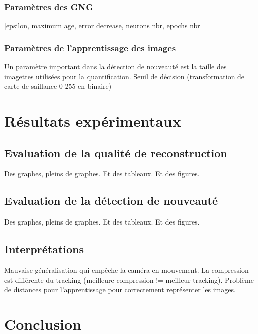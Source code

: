 	\subsubsection{Paramètres des GNG}

	[epsilon, maximum age, error decrease, neurons nbr, epochs nbr]

	\subsubsection{Paramètres de l'apprentissage des images}

	Un paramètre important dans la détection de nouveauté est la taille des imagettes utilisées pour la quantification. 
	Seuil de décision (transformation de carte de saillance 0-255 en binaire)

	\newpage

	\section{Résultats expérimentaux}
	\subsection{Evaluation de la qualité de reconstruction}

	Des graphes, pleins de graphes. Et des tableaux. Et des figures.

	\subsection{Evaluation de la détection de nouveauté}
	
	Des graphes, pleins de graphes. Et des tableaux. Et des figures.

	\subsection{Interprétations}

	Mauvaise généralisation qui empêche la caméra en mouvement. La compression est différente du tracking (meilleure compression != meilleur tracking). Problème de distances pour l'apprentissage pour correctement représenter les images.

	\section{Conclusion}
		

